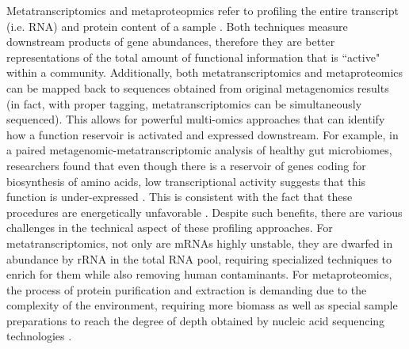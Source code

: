 Metatranscriptomics and metaproteopmics refer to profiling the entire transcript (i.e. RNA) and protein content of a sample \cite{franzosa2015sequencing}. Both techniques measure downstream products of gene abundances, therefore they are better representations of the total amount of functional information that is ``active" within a community. Additionally, both metatranscriptomics and metaproteomics can be mapped back to sequences obtained from original metagenomics results (in fact, with proper tagging, metatranscriptomics can be simultaneously sequenced). This allows for powerful multi-omics approaches that can identify how a function reservoir is activated and expressed downstream. For example, in a paired metagenomic-metatranscriptomic analysis of healthy gut microbiomes, researchers found that even though there is a reservoir of genes coding for biosynthesis of amino acids, low transcriptional activity suggests that this function is under-expressed \cite{franzosa2014relating}. This is consistent with the fact that these procedures are energetically unfavorable \cite{oliphant2019macronutrient}. Despite such benefits, there are various challenges in the technical aspect of these profiling approaches. For metatranscriptomics, not only are mRNAs highly unstable, they are dwarfed in abundance by rRNA in the total RNA pool, requiring specialized techniques to enrich for them while also removing human contaminants. For metaproteomics, the process of protein purification and extraction is demanding due to the complexity of the environment, requiring more biomass as well as special sample preparations to reach the degree of depth obtained by nucleic acid sequencing technologies \cite{leary2013which, schiebenhoefer2019challenges, verberkmoes2009shotgun}. 

